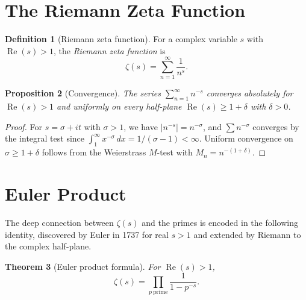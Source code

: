 \documentclass[12pt,a4paper,openany]{book}
\theoremstyle{definition}
\newtheorem{definition}{Definition}[chapter]
\theoremstyle{plain}
\newtheorem{theorem}[definition]{Theorem}
\newtheorem{proposition}[definition]{Proposition}
\theoremstyle{remark}
\newcommand{\abs}[1]{\left|#1\right|}
\begin{document}
\section{The Riemann Zeta Function}
\label{sec:zeta}

\begin{definition}[Riemann zeta function]
\label{def:zeta}
For a complex variable $s$ with $\operatorname{Re}(s) > 1$, the
\emph{Riemann zeta function} is
\[
  \zeta(s) = \sum_{n=1}^{\infty} \frac{1}{n^s}.
\]
\end{definition}

\begin{proposition}[Convergence]
\label{prop:zeta-convergence}
The series $\sum_{n=1}^{\infty} n^{-s}$ converges absolutely for
$\operatorname{Re}(s) > 1$ and uniformly on every half-plane
$\operatorname{Re}(s) \geq 1 + \delta$ with $\delta > 0$.
\end{proposition}

\begin{proof}
For $s = \sigma + it$ with $\sigma > 1$, we have
$\abs{n^{-s}} = n^{-\sigma}$, and $\sum n^{-\sigma}$ converges by the
integral test since $\int_1^\infty x^{-\sigma}\,dx = 1/(\sigma-1) < \infty$.
Uniform convergence on $\sigma \geq 1+\delta$ follows from the Weierstrass
$M$-test with $M_n = n^{-(1+\delta)}$.
\end{proof}

\section{Euler Product}
\label{sec:euler-product}

The deep connection between $\zeta(s)$ and the primes is encoded in the
following identity, discovered by Euler in 1737 for real $s > 1$ and extended
by Riemann to the complex half-plane.

\begin{theorem}[Euler product formula]
\label{thm:euler-product}
For $\operatorname{Re}(s) > 1$,
\[
  \zeta(s) = \prod_{p\ \mathrm{prime}} \frac{1}{1 - p^{-s}}.
\]
\end{theorem}
\end{document}

